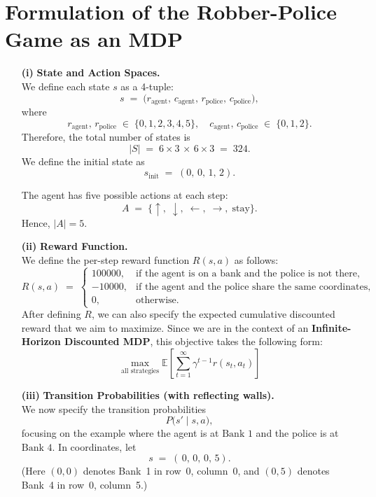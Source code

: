 \section*{Formulation of the Robber-Police Game as an MDP}

\begin{enumerate}

  \item[\textbf{(i)}]
    \textbf{State and Action Spaces.} \\
    We define each state \(s\) as a 4-tuple:
    \[
      s \;=\; \bigl(r_{\text{agent}},\,c_{\text{agent}},\,r_{\text{police}},\,c_{\text{police}}\bigr),
    \]
    where
    \[
      r_{\text{agent}},\,r_{\text{police}} \;\in\;\{0,1,2,3,4,5\},
      \quad
      c_{\text{agent}},\,c_{\text{police}} \;\in\;\{0,1,2\}.
    \]
    Therefore, the total number of states is
    \[
      |S| \;=\; 6 \times 3 \,\times\, 6 \times 3 \;=\; 324.
    \]
    We define the initial state as
    \[
      s_{\text{init}} \;=\; (0,\,0,\,1,\,2).
    \]

    The agent has five possible actions at each step:
    \[
      A \;=\; \{\uparrow,\;\downarrow,\;\leftarrow,\;\rightarrow,\;\text{stay}\}.
    \]
    Hence, \(\lvert A \rvert = 5\).

  \item[\textbf{(ii)}]
    \textbf{Reward Function.} \\
    We define the per-step reward function \(R(s,a)\) as follows:
    \[
      R(s, a) \;=\;
      \begin{cases}
        100000, & \text{if the agent is on a bank and the police is not there,} \\
        -10000, & \text{if the agent and the police share the same coordinates,} \\
        0, & \text{otherwise.}
      \end{cases}
    \]
    After defining \( R \), we can also specify the expected cumulative discounted reward that we aim to maximize. Since we are in the context of an \textbf{Infinite-Horizon Discounted MDP}, this objective takes the following form:
    \[
    \max_{\text{all strategies}} \mathbb{E} \left[ \sum_{t=1}^{\infty} \gamma^{t-1} r(s_t, a_t) \right]
    \]

  \item[\textbf{(iii)}]
    \textbf{Transition Probabilities (with reflecting walls).} \\
    We now specify the transition probabilities
    \[
      P\bigl(s' \mid s, a\bigr),
    \]
    focusing on the example where the agent is at \(\text{Bank 1}\) and the police is at \(\text{Bank 4}\). 
    In coordinates, let
    \[
      s \;=\; (\,0,\,0,\,0,\,5).
    \]
    (Here \((0,0)\) denotes Bank~1 in row~0, column~0, and \((0,5)\) denotes Bank~4 in row~0, column~5.)


\end{enumerate}
